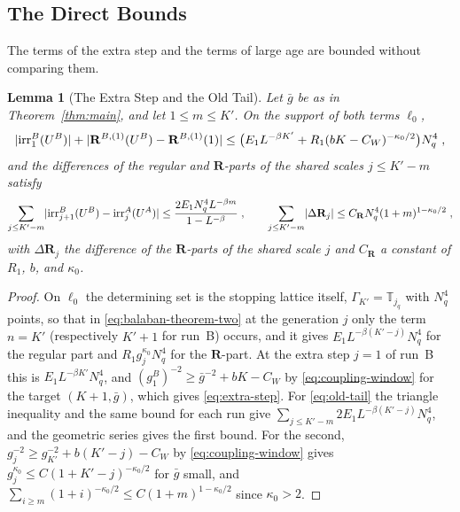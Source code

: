 \documentclass[11pt]{preprint}
\DeclarePairedDelimiter{\abs}{\lvert}{\rvert}
\numberwithin{equation}{section}
\newtheorem{lemma}[theorem]{Lemma}
\theoremstyle{definition}
\theoremstyle{remark}
\theoremstyle{plain}
\begin{document}
\subsection{The Direct Bounds}\label{sec:direct-bounds}

The terms of the extra step and the terms of large age are bounded without comparing them.

\begin{lemma}[The Extra Step and the Old Tail]\label{lem:direct-bounds}
Let $\bar g$ be as in Theorem~\ref{thm:main}, and let $1 \leq m \leq K'$. On the support of both terms $\ell_0$,
\begin{equation}\label{eq:extra-step}
    \abs{\mathrm{irr}^B_1(U^B)} + \abs{\mathbf R^{B,(1)}(U^B) - \mathbf R^{B,(1)}(1)} \leq \bigl(E_1L^{-\beta K'} + R_1(bK - C_W)^{-\kappa_0/2}\bigr)N_q^4\;,
\end{equation}
and the differences of the regular and $\mathbf R$-parts of the shared scales $j \leq K' - m$ satisfy
\begin{equation}\label{eq:old-tail}
    \sum_{j \leq K'-m}\abs{\mathrm{irr}^B_{j+1}(U^B) - \mathrm{irr}^A_j(U^A)} \leq \frac{2E_1N_q^4L^{-\beta m}}{1 - L^{-\beta}}\;,
    \qquad
    \sum_{j \leq K'-m}\abs{\Delta\mathbf R_j} \leq C_{\mathbf R}N_q^4(1 + m)^{1-\kappa_0/2}\;,
\end{equation}
with $\Delta\mathbf R_j$ the difference of the $\mathbf R$-parts of the shared scale $j$ and $C_{\mathbf R}$ a constant of $R_1$, $b$, and $\kappa_0$.
\end{lemma}

\begin{proof}
On $\ell_0$ the determining set is the stopping lattice itself, $\Gamma_{K'} = \mathbb T_{j_q}$ with $N_q^4$ points, so that in \eqref{eq:balaban-theorem-two} at the generation $j$ only the term $n = K'$ (respectively $K' + 1$ for run~B) occurs, and it gives $E_1L^{-\beta(K'-j)}N_q^4$ for the regular part and $R_1g_j^{\kappa_0}N_q^4$ for the $\mathbf R$-part. At the extra step $j = 1$ of run~B this is $E_1L^{-\beta K'}N_q^4$, and $(g^B_1)^{-2} \geq \bar g^{-2} + bK - C_W$ by \eqref{eq:coupling-window} for the target $(K + 1, \bar g)$, which gives \eqref{eq:extra-step}. For \eqref{eq:old-tail} the triangle inequality and the same bound for each run give $\sum_{j \leq K'-m}2E_1L^{-\beta(K'-j)}N_q^4$, and the geometric series gives the first bound. For the second, $g_j^{-2} \geq g_{K'}^{-2} + b(K' - j) - C_W$ by \eqref{eq:coupling-window} gives $g_j^{\kappa_0} \leq C(1 + K' - j)^{-\kappa_0/2}$ for $\bar g$ small, and $\sum_{i \geq m}(1 + i)^{-\kappa_0/2} \leq C(1 + m)^{1-\kappa_0/2}$ since $\kappa_0 > 2$.
\end{proof}
\end{document}
